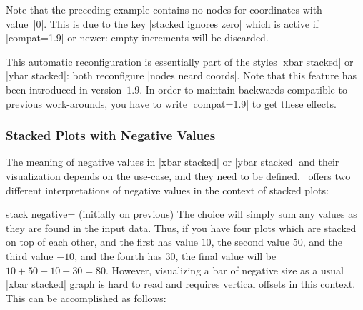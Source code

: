 {Note that the preceding example contains no nodes for coordinates with value~|0|. This is due to the key |stacked ignores zero| which is active if |compat=1.9| or newer: empty increments will be discarded.

This automatic reconfiguration is essentially part of the styles |xbar stacked| or |ybar stacked|: both reconfigure |nodes neard coords|. Note that this feature has been introduced in version~$1.9$. In order to maintain backwards compatible to previous work-arounds, you have to write |compat=1.9| to get these effects.

\begin{codeexample}[]
\end{codeexample}

\subsubsection{Stacked Plots with Negative Values}

The meaning of negative values in |xbar stacked| or |ybar stacked| and their visualization depends on the use-case, and they need to be defined. \PGFPlots\ offers two different interpretations of negative values in the context of stacked plots:

\begin{pgfplotskey}{stack negative= (initially on previous)}
	The choice  will simply sum any values as they are found in the input data. Thus, if you have four plots which are stacked on top of each other, and the first has value $10$, the second value $50$, and the third value $-10$, and the fourth has $30$, the final value will be $10+50-10+30 = 80$. However, visualizing a bar of negative size as a usual |xbar stacked| graph is hard to read and requires vertical offsets in this context. This can be accomplished as follows:
\begin{codeexample}[]
\end{codeexample}
\end{pgfplotskey}}
